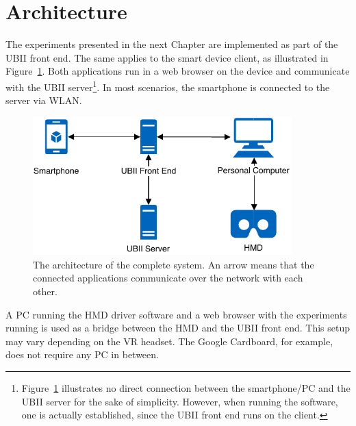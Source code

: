 \section{Architecture}\label{section:architecture}

The experiments presented in the next Chapter are implemented as part of the \ac{UBII} front end. The same applies to the smart device client, as illustrated in Figure~\ref{fig:architecture}. Both applications run in a web browser on the device and communicate with the \ac{UBII} server\footnote{Figure~\ref{fig:architecture} illustrates no direct connection between the smartphone/\ac{PC} and the \ac{UBII} server for the sake of simplicity. However, when running the software, one is actually established, since the \ac{UBII} front end runs on the client.}. In most scenarios, the smartphone is connected to the server via \ac{WLAN}.

\begin{figure}[H]
  \centering
  \includegraphics[width=10cm]{figures/implementation/architecture.pdf}
  \caption[The system architecture]{The architecture of the complete system. An arrow means that the connected applications communicate over the network with each other.}\label{fig:architecture}
\end{figure}

A \ac{PC} running the \ac{HMD} driver software and a web browser with the experiments running is used as a bridge between the \ac{HMD} and the \ac{UBII} front end. This setup may vary depending on the \ac{VR} headset. The Google Cardboard, for example, does not require any \ac{PC} in between.

